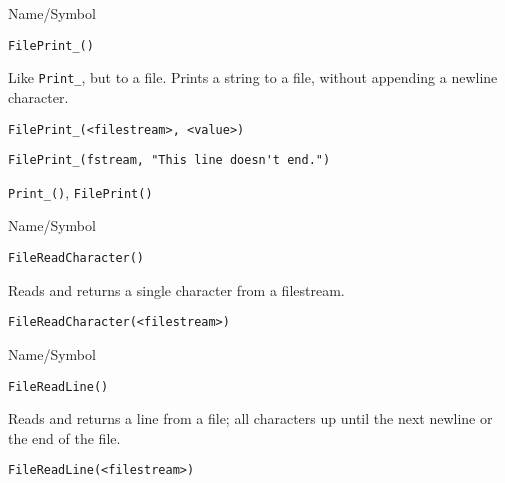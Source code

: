 \rl




\begin{desc}{Name/Symbol}
\item[Name/Symbol]	\verb+FilePrint_()+

\item[Description]	Like \verb+Print_+, but to a file.  Prints a string to a file,	without appending a newline character.
	
\item[Usage]
\begin{verbatim}
FilePrint_(<filestream>, <value>)
\end{verbatim}

\item[Example]
\begin{verbatim}
FilePrint_(fstream, "This line doesn't end.")
\end{verbatim}

\item[See Also]	\verb+Print_()+, \verb+FilePrint()+
\end{desc}

\rl




\begin{desc}{Name/Symbol}
\item[Name/Symbol]	\verb+FileReadCharacter()+

\item[Description]	Reads and returns a single character from a filestream.

\item[Usage]
\begin{verbatim}
FileReadCharacter(<filestream>)
\end{verbatim}

\item[Example]	

\item[See Also]	
\end{desc}

\rl




\begin{desc}{Name/Symbol}
\item[Name/Symbol]	\verb+FileReadLine()+

\item[Description]	Reads and returns a line from a file; all characters up
		until the next newline or the end of the file.

\item[Usage]
\begin{verbatim}
FileReadLine(<filestream>)
\end{verbatim}

\item[Example]	

\item[See Also]	
\end{desc}

